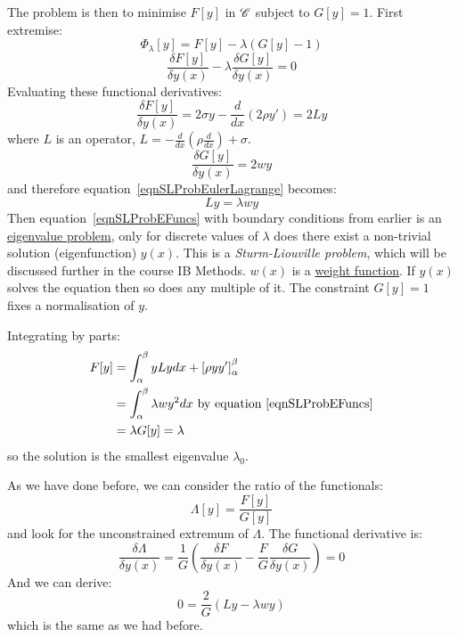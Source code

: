 \documentclass[../Main.tex]{subfiles}
\begin{document}
The problem is then to minimise $F[y]$ in $\mathscr{C}$ subject to $G[y] = 1$. First extremise:
\begin{equation*}
    \Phi_\lambda[y] = F[y] - \lambda\left(G[y] - 1\right)
\end{equation*}
\begin{equation}
    \frac{\delta F[y]}{\delta y(x)} - \lambda \frac{\delta G[y]}{\delta y(x)} = 0
    \label{eqnSLProbEulerLagrange}
\end{equation}
Evaluating these functional derivatives:
\begin{equation*}
    \frac{\delta F[y]}{\delta y(x)} = 2\sigma y - \frac{d}{dx} (2 \rho y') = 2Ly
\end{equation*}
where $L$ is an operator, $L = -\frac{d}{dx} (\rho \frac{d}{dx}) + \sigma$.
\begin{equation*}
    \frac{\delta G[y]}{\delta y(x)} = 2wy
\end{equation*}
and therefore equation~\ref{eqnSLProbEulerLagrange} becomes:
\begin{equation}
    Ly = \lambda w y
    \label{eqnSLProbEFuncs}
\end{equation}
Then equation~\ref{eqnSLProbEFuncs} with boundary conditions from earlier is an \underline{eigenvalue problem}, only for discrete values of $\lambda$ does there exist a non-trivial solution (eigenfunction) $y(x)$. This is a \textit{Sturm-Liouville problem}, which will be discussed further in the course IB Methods. $w(x)$ is a \underline{weight function}. If $y(x)$ solves the equation then so does any multiple of it. The constraint $G[y] = 1$ fixes a normalisation of $y$.

Integrating by parts:
\begin{align*}
    F[y] &= \int_\alpha^\beta y Ly dx + \left[\rho y y'\right]_\alpha^\beta \\
    &= \int_\alpha^\beta \lambda w y^2 dx \text{ by equation~\ref{eqnSLProbEFuncs}} \\
    &= \lambda G[y] = \lambda
\end{align*}
so the solution is the smallest eigenvalue $\lambda_0$.

As we have done before, we can consider the ratio of the functionals:
\begin{equation*}
    \Lambda[y] = \frac{F[y]}{G[y]}
\end{equation*}
and look for the unconstrained extremum of $\Lambda$. The functional derivative is:
\begin{equation*}
    \frac{\delta \Lambda}{\delta y(x)} = \frac{1}{G} \left(\frac{\delta F}{\delta y(x)} - \frac{F}{G} \frac{\delta G}{\delta y(x)}\right) = 0
\end{equation*}
And we can derive:
\begin{equation*}
    0 = \frac{2}{G} \left(Ly - \lambda w y\right)
\end{equation*}
which is the same as we had before.
\end{document}
